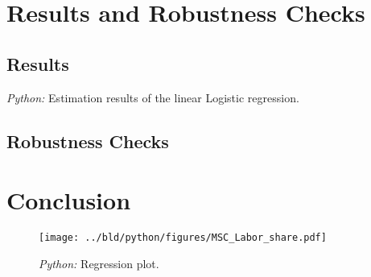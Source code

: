 \documentclass[11pt, a4paper, leqno]{article}
\begin{document}
\section{Results and Robustness Checks} \label{results}
\subsection{Results}
\begin{table}[!h]
    
    \caption{\label{tab:python-summary}\emph{Python:} Estimation results of the
        linear Logistic regression.}
\end{table}

\subsection{Robustness Checks}


\section{Conclusion} \label{conclusion}

\printbibliography
{}


\appendix

\begin{figure}[H]

    \centering
    \texttt{[image: ../bld/python/figures/MSC\_Labor\_share.pdf]}

    \caption{\emph{Python:} Regression plot.}
    \label{fig:python-predictions}

\end{figure}

\end{document}
